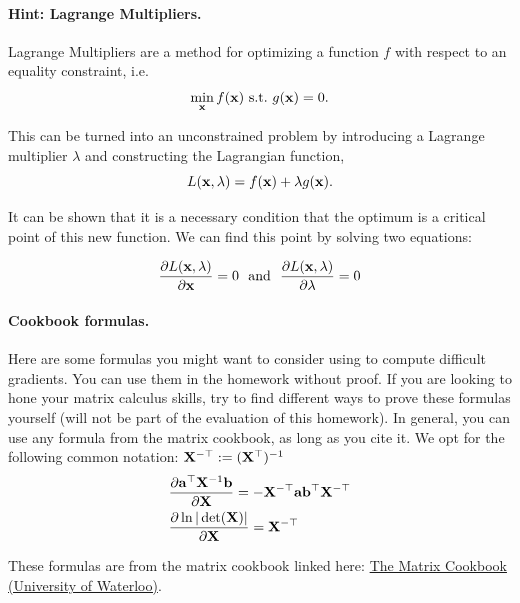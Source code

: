\documentclass[submit]{../harvardml}
\begin{document}
\begin{problem}
\paragraph{Hint: Lagrange Multipliers.} Lagrange Multipliers are a method for
optimizing a function $f$ with respect to an
equality constraint, i.e.
\[\min_{\mathbf{x}} f(\mathbf{x})\ \text{s.t.}\ g(\mathbf{x}) = 0.\]

This can be turned into an unconstrained problem by introducing a
Lagrange multiplier $\lambda$ and constructing the Lagrangian function,
\[L(\mathbf{x}, \lambda) =  f(\mathbf{x}) + \lambda g(\mathbf{x}).\]

It can be shown that it is a necessary condition that the optimum
is a critical point of this new function. We can find this point by solving two equations:

\[\frac{\partial L(\mathbf{x}, \lambda)}{\partial  \mathbf{x}} = 0  \ \ \text{and}\  \  \frac{\partial L(\mathbf{x}, \lambda)}{\partial \lambda} = 0 \]


\paragraph{Cookbook formulas.} Here are some formulas you might want to consider
using to compute difficult gradients. You can use them  in the homework
without proof. If you are looking to hone your matrix calculus skills, try to
find different ways to prove these formulas yourself (will not be part of the
evaluation of this homework). In general, you can use any formula from the matrix cookbook,
as long as you cite it. We opt for the following common notation:
$\mathbf{X}^{-\top} := (\mathbf{X}^{\top})^{-1}$
\begin{align*}
   & \frac{\partial \mathbf{a}^\top \mathbf{X}^{-1} \mathbf{b}}{\partial \mathbf{X}} = - \mathbf{X}^{-\top} \mathbf{a} \mathbf{b}^\top \mathbf{X}^{-\top} \\
   & \frac{\partial \ln | \det (\mathbf{X}) |}{\partial \mathbf{X}} = \mathbf{X}^{-\top}
\end{align*}

These formulas are from the matrix cookbook linked here: \href{https://www.math.uwaterloo.ca/~hwolkowi/matrixcookbook.pdf}{The Matrix Cookbook (University of Waterloo)}.  
\end{problem}


\newpage
\end{document}
